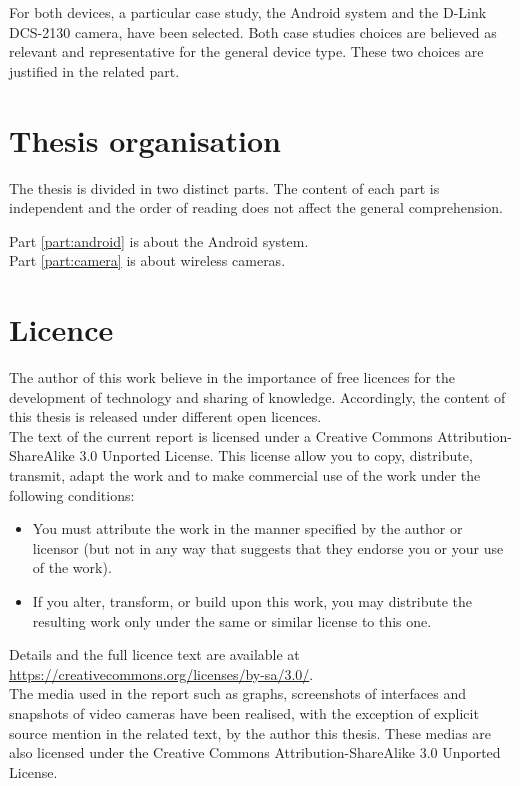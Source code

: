 For both devices, a particular case study, the Android system and the D-Link DCS-2130 camera, have been selected.
Both case studies choices are believed as relevant and representative for the general device type.
These two choices are justified in the related part.


\section{Thesis organisation}

The thesis is divided in two distinct parts.
The content of each part is independent and the order of reading does not affect the general comprehension.

Part \ref{part:android} is about the Android system.\\

Part \ref{part:camera} is about wireless cameras.

\section{Licence}

The author of this work believe in the importance of free licences for the development of technology and sharing of knowledge.
Accordingly, the content of this thesis is released under different open licences.\\

The text of the current report is licensed under a Creative Commons Attribution-ShareAlike 3.0 Unported License.
This license allow you to copy, distribute, transmit, adapt the work and to make commercial use of the work under the following conditions:

\begin{itemize}
\item You must attribute the work in the manner specified by the author or licensor (but not in any way that suggests that they endorse you or your use of the work).
\item  If you alter, transform, or build upon this work, you may distribute the resulting work only under the same or similar license to this one. 
\end{itemize}

Details and the full licence text are available at \url{https://creativecommons.org/licenses/by-sa/3.0/}.\\

The media used in the report such as graphs, screenshots of interfaces and snapshots of video cameras have been realised, with the exception of explicit source mention in the related text, by the author this thesis.
These medias are also licensed under the Creative Commons Attribution-ShareAlike 3.0 Unported License.\\

